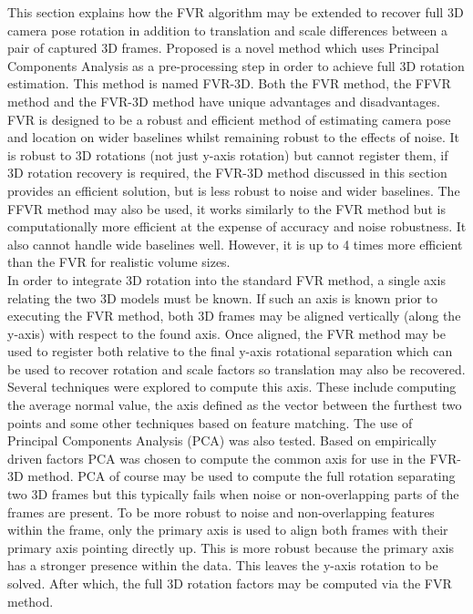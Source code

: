 
This section explains how the FVR algorithm may be extended to recover full 3D camera pose rotation in addition to translation and scale differences between a pair of captured 3D frames. Proposed is a novel method which uses Principal Components Analysis as a pre-processing step in order to achieve full 3D rotation estimation. This method is named FVR-3D. Both the FVR method, the FFVR method and the FVR-3D method have unique advantages and disadvantages. FVR is designed to be a robust and efficient method of estimating camera pose and location on wider baselines whilst remaining robust to the effects of noise. It is robust to 3D rotations (not just y-axis rotation) but cannot register them, if 3D rotation recovery is required, the FVR-3D method discussed in this section provides an efficient solution, but is less robust to noise and wider baselines. The FFVR method may also be used, it works similarly to the FVR method but is computationally more efficient at the expense of accuracy and noise robustness. It also cannot handle wide baselines well. However, it is up to 4 times more efficient than the FVR for realistic volume sizes. \\

In order to integrate 3D rotation into the standard FVR method, a single axis relating the two 3D models must be known. If such an axis is known prior to executing the FVR method, both 3D frames may be aligned vertically (along the y-axis) with respect to the found axis. Once aligned, the FVR method may be used to register both relative to the final y-axis rotational separation which can be used to recover rotation and scale factors so translation may also be recovered. \\

Several techniques were explored to compute this axis. These include computing the average normal value, the axis defined as the vector between the furthest two points and some other techniques based on feature matching. The use of Principal Components Analysis (PCA) was also tested. Based on empirically driven factors PCA was chosen to compute the common axis for use in the FVR-3D method. PCA of course may be used to compute the full rotation separating two 3D frames but this typically fails when noise or non-overlapping parts of the frames are present. To be more robust to noise and non-overlapping features within the frame, only the primary axis is used to align both frames with their primary axis pointing directly up. This is more robust because the primary axis has a stronger presence within the data. This leaves the y-axis rotation to be solved. After which, the full 3D rotation factors may be computed via the FVR method. \\

